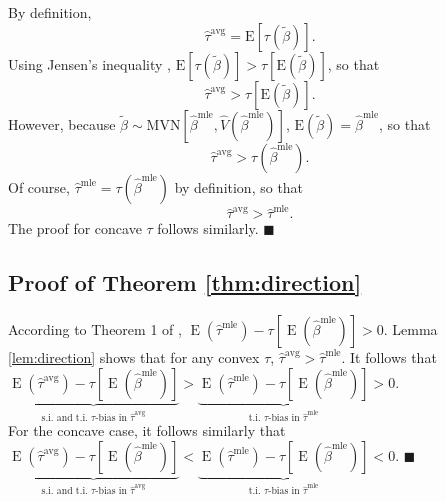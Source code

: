 \documentclass[12pt]{article}
\newenvironment{proof}[1][Proof]{\begin{trivlist}
\item[\hskip \labelsep {\bfseries #1}]}{\end{trivlist}}
\DeclareMathOperator*{\E}{\text{E}}
\begin{document}
\begin{proof}
By definition, $$ \hat{\tau}^{\text{avg}} = \text{E}\left[ \tau \left(\tilde{\beta} \right) \right].$$
Using Jensen's inequality \citep[p.\@ 190, Thm.\@ 4.7.7]{CasellaBerger2002}, $\text{E}\left[ \tau \left(\tilde{\beta} \right) \right] > \tau \left[ \text{E}\left( \tilde{\beta} \right) \right]$, so that $$\hat{\tau}^{\text{avg}} > \tau \left[ \text{E}\left( \tilde{\beta} \right) \right].$$
However, because $\tilde{\beta} \sim \text{MVN} \left[ \hat{\beta}^{\text{mle}}, \hat{V} \left( \hat{\beta}^{\text{mle}} \right) \right]$, $\text{E}\left( \tilde{\beta} \right) = \hat{\beta}^\text{mle}$, so that
$$\hat{\tau}^{\text{avg}} > \tau \left( \hat{\beta}^\text{mle}\right).$$
Of course, $\hat{\tau}^\text{mle} = \tau \left( {\hat{\beta}^\text{mle}} \right)$ by definition, so that $$\hat{\tau}^{\text{avg}} > \hat{\tau}^\text{mle}.$$
The proof for concave $\tau$ follows similarly.
 $\blacksquare$
\end{proof}

\subsection{Proof of Theorem \ref{thm:direction}}

\begin{proof}
According to Theorem 1 of \citet[p.\@ 405]{Rainey2017}, $\E\left( \hat{\tau}^\text{mle}\right) -  \tau \left[\E\left( \hat{\beta}^\text{mle} \right) \right] > 0$.
Lemma \ref{lem:direction} shows that for any convex $\tau$, $\hat{\tau}^{\text{avg}} > \hat{\tau}^\text{mle}$.
It follows that $\underbrace{\E\left( \hat{\tau}^\text{avg}\right) - \tau \left[\E\left( \hat{\beta}^\text{mle} \right) \right]}_{\text{s.i. and t.i. } \tau\text{-bias in }\hat{\tau}^{\text{avg}}} > \underbrace{\E\left( \hat{\tau}^\text{mle}\right) -  \tau \left[\E\left( \hat{\beta}^\text{mle} \right) \right]}_{\text{t.i. } \tau\text{-bias in }\hat{\tau}^{\text{mle}}} > 0$.\\

\noindent For the concave case, it follows similarly that $\underbrace{\E\left( \hat{\tau}^\text{avg}\right) - \tau \left[\E\left( \hat{\beta}^\text{mle} \right) \right]}_{\text{s.i. and t.i. } \tau\text{-bias in }\hat{\tau}^{\text{avg}}} < \underbrace{\E\left( \hat{\tau}^\text{mle}\right) -  \tau \left[\E\left( \hat{\beta}^\text{mle} \right) \right]}_{\text{t.i. } \tau\text{-bias in }\hat{\tau}^{\text{mle}}} < 0$.
 $\blacksquare$
\end{proof}
\end{document}
